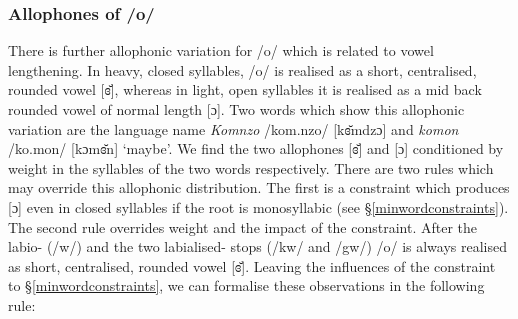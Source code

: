 \subsubsection{Allophones of /o/}\label{allo-o}

There is further allophonic variation for /o/ which is related to vowel lengthening. In heavy, closed syllables, /o/ is realised as a short, centralised, rounded vowel [ɞ̆], whereas in light, open syllables it is realised as a mid back rounded vowel of normal length [ɔ]. Two words which show this allophonic variation are the language name \emph{Komnzo} /kom.nzo/ [kɞ̆mdzɔ] and \emph{komon} /ko.mon/ [kɔmɞ̆n] `maybe'. We find the two allophones [ɞ̆] and [ɔ] conditioned by  weight in the syllables of the two words respectively. There are two rules which may override this allophonic distribution. The first is a  constraint which produces [ɔ] even in closed syllables if the root is monosyllabic (see \S{}\ref{minwordconstraints}). The second rule overrides  weight and the impact of the  constraint. After the labio-  (/w/) and the two labialised- stops (/kw/ and /gw/) /o/ is always realised as short, centralised, rounded vowel [ɞ̆]. Leaving the influences of the  constraint to \S{}\ref{minwordconstraints}, we can formalise these observations in the following rule:

